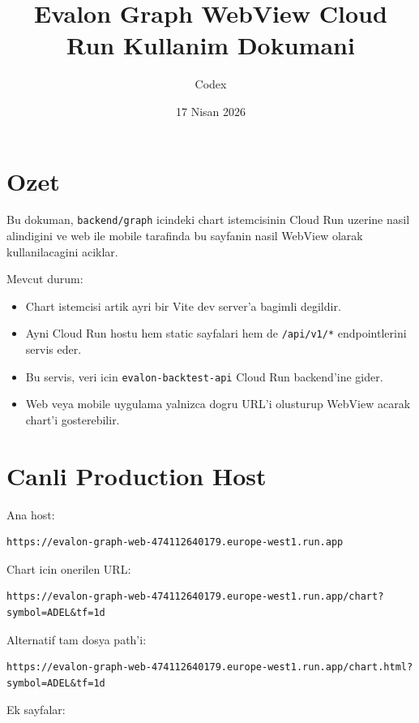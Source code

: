 \documentclass[11pt,a4paper]{article}
\title{Evalon Graph WebView Cloud Run Kullanim Dokumani}
\author{Codex}
\date{17 Nisan 2026}
\begin{document}
\maketitle

\section{Ozet}

Bu dokuman, \texttt{backend/graph} icindeki chart istemcisinin Cloud Run uzerine nasil alindigini ve web ile mobile tarafinda bu sayfanin nasil WebView olarak kullanilacagini aciklar.

Mevcut durum:

\begin{itemize}
  \item Chart istemcisi artik ayri bir Vite dev server'a bagimli degildir.
  \item Ayni Cloud Run hostu hem static sayfalari hem de \texttt{/api/v1/*} endpointlerini servis eder.
  \item Bu servis, veri icin \texttt{evalon-backtest-api} Cloud Run backend'ine gider.
  \item Web veya mobile uygulama yalnizca dogru URL'i olusturup WebView acarak chart'i gosterebilir.
\end{itemize}

\section{Canli Production Host}

Ana host:

\begin{lstlisting}[style=evalon]
https://evalon-graph-web-474112640179.europe-west1.run.app
\end{lstlisting}

Chart icin onerilen URL:

\begin{lstlisting}[style=evalon]
https://evalon-graph-web-474112640179.europe-west1.run.app/chart?symbol=ADEL&tf=1d
\end{lstlisting}

Alternatif tam dosya path'i:

\begin{lstlisting}[style=evalon]
https://evalon-graph-web-474112640179.europe-west1.run.app/chart.html?symbol=ADEL&tf=1d
\end{lstlisting}

Ek sayfalar:
\end{document}
